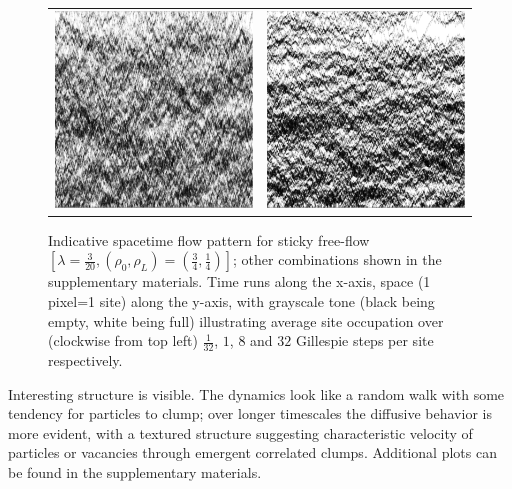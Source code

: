 \documentclass[
reprint, amsmath,amssymb, aps,
 pre, longbibliography,
]{revtex4-1}
\begin{document}
\begin{figure}[h!]
\begin{center}
\begin{tabular}{c | c}
    \includegraphics[width=0.49\linewidth]{longTime} &\includegraphics[width=0.49\linewidth]{midLongTime}
    \end{tabular}
\end{center}
\caption{\label{fig:flowPatterns} 
Indicative spacetime flow pattern for sticky free-flow $\left[\lambda = \frac{3}{20}, (\rho_0, \rho_L) = (\frac{3}{4}, \frac{1}{4})\right]$; other combinations shown in the supplementary materials.
Time runs along the x-axis, space (1 pixel=1 site) along the y-axis, with grayscale tone (black being empty, white being full) illustrating average site occupation over (clockwise from top left) $\frac{1}{32}$, $1$, $8$ and $32$ Gillespie steps per site respectively.}
\end{figure}

Interesting structure is visible. The dynamics look like a random walk with
some tendency for particles to clump; over longer timescales the
diffusive behavior is more evident, with a textured structure
suggesting characteristic velocity of particles or vacancies through
emergent correlated clumps.  Additional plots can be found in the
supplementary materials.
\end{document}
